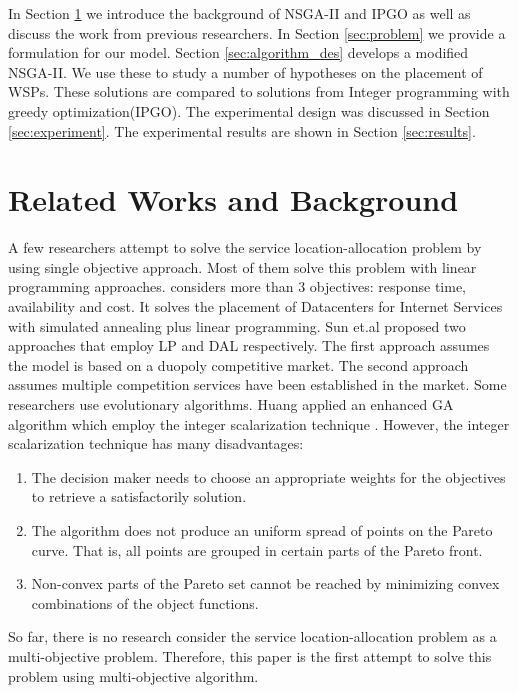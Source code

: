 \documentclass{llncs}
\begin{document}
In Section \ref{sec:Background} we introduce the background of NSGA-II and IPGO as well as discuss the work from previous researchers.
In Section \ref{sec:problem} we provide a formulation for our model. Section \ref{sec:algorithm_des} develops a modified NSGA-II. 
We use these to study a number of hypotheses on the placement of WSPs. These solutions are compared to solutions from Integer
programming with greedy optimization(IPGO). 
The experimental design was discussed in Section \ref{sec:experiment}. The experimental results are shown in Section \ref{sec:results}.


\section{Related Works and Background}
\label{sec:Background}
A few researchers attempt to solve the service location-allocation problem by using single objective approach. Most of them solve this problem with linear programming approaches.
\cite{5961695} considers more than 3 objectives: response time, availability and cost. 
It solves the placement of Datacenters for Internet Services with simulated annealing plus linear programming. 
Sun et.al proposed two approaches \cite{Aboolian} \cite{Sun} that employ LP and DAL respectively. 
The first approach \cite{Aboolian} assumes the model is based on a duopoly competitive market.
The second approach \cite{Sun} assumes multiple competition services have been established in the market.
Some researchers use evolutionary algorithms. Huang \cite{EnhancedGenetic} applied an enhanced GA algorithm which employ the integer scalarization technique \cite{Multiobjective}. However, 
the integer scalarization technique has many disadvantages:
\begin{enumerate}
	\item The decision maker needs to choose an appropriate weights for the objectives to retrieve a satisfactorily solution.
	\item The algorithm does not produce an uniform spread of points on the Pareto curve. That is, all points are grouped in certain parts of the Pareto front.
	\item Non-convex parts of the Pareto set cannot be reached by minimizing convex combinations of the object functions.
\end{enumerate}

So far, there is no research consider the service location-allocation problem as a multi-objective problem. Therefore, this paper is the first attempt to solve this problem using 
multi-objective algorithm.
\end{document}
